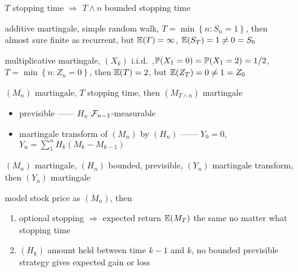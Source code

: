 \begin{fact}
    $T$ stopping time $\Rightarrow$ $T \wedge n$ bounded stopping time
\end{fact}

\begin{counterexample}
    additive martingale, simple random walk, $T = \min \left\{ n : S_n = 1 \right\}$, then \\
    almost sure finite as recurrent, but $\mathbb{E}(T) = \infty$, $\mathbb{E}(S_T) = 1 \neq 0 = S_0$
\end{counterexample}

\begin{counterexample}
    multiplicative martingale, $(X_k)$ i.i.d.\ ,$\mathbb{P}(X_1 = 0) = \mathbb{P}(X_1 = 2) = 1/2$, $T = \min \left\{ n : Z_n = 0 \right\}$, then
    $\mathbb{E}(T) = 2$, but $\mathbb{E}(Z_T) = 0 \neq 1 = Z_0$
\end{counterexample}

\begin{thm}
    $(M_n)$ martingale, $T$ stopping time, then $(M_{T \wedge n})$ martingale
\end{thm}

\begin{itemize}
    \item previsible ------ $H_n$ $\mathcal{F}_{n-1}$-measurable
    \item martingale transform of $(M_n)$ by $(H_n)$ ------ $Y_0 = 0$, $Y_n = \sum^n_1 H_k(M_k - M_{k-1})$
\end{itemize}

\begin{thm}
    $(M_n)$ martingale, $(H_n)$ bounded, previsible, $(Y_n)$ martingale transform, then $(Y_n)$ martingale
\end{thm}

\begin{fact}
    model stock price as $(M_n)$, then
    \begin{enumerate}
        \item optional stopping $\Rightarrow$ expected return $\mathbb{E}(M_T)$ the same no matter what stopping time
        \item $(H_k)$ amount held between time $k - 1$ and $k$, no bounded previsible strategy gives expected gain or loss
    \end{enumerate}
\end{fact}

